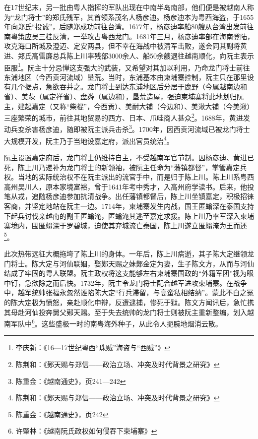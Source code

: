 在17世纪末，另一批由粤人指挥的军队出现在中南半岛南部，他们便是被越南人称为“龙门将士”的郑氏残军，其首领系茂名人杨彦迪。杨彦迪本为粤西海盗，于1655年向郑氏“投诚”，后随郑成功前往台湾。1677年，杨彦迪率船80艘从台湾出发前往南粤策应吴三桂反清，一举攻占粤西龙门。1681年三月，杨彦迪率部在海南登陆，攻克海口所城及澄迈、定安两县，但不幸在海战中被清军击败，遂会同其副将黄进、郑氏高雷廉总兵陈上川率残部3000余人、船50余艘退往越南顺化，向阮主表示臣服\footnote{李庆新：《16—17世纪粤西“珠贼”海盗与“西贼”》}。阮主十分忌惮这支强大的武装，又希望对其加以利用，乃命龙门将士前往东浦地区（今西贡河流域）垦荒。当时，东浦基本由柬埔寨控制，阮主只在那里设有几个据点，急欲吞并之。龙门将士到达东浦地区后分居于鹿野（今属越南边和省）、美萩（属定祥省）、盘粦（属边和），垦荒造屋，强迫柬埔寨将此地划归阮主，建起嘉定（又称“柴棍”，今西贡）、美耐大铺（今边和）、美湫大铺（今美湫）三座繁荣的城市，前往其地贸易的西方、日本、爪哇商人甚众\footnote{陈荆和：《鄚天赐与郑信——政治立场、冲突及时代背景之研究》}。1688年，黄进发动兵变杀害杨彦迪，随即被阮主派兵击杀\footnote{陈重金：《越南通史》，页241—242}。1700年，因西贡河流域已被龙门将士大规模开发，阮主乃于当地设嘉定府，派出官员统治\footnote{陈荆和：《鄚天赐与郑信——政治立场、冲突及时代背景之研究》}。

阮主设置嘉定府后，龙门将士仍维持自主，不受越南军官节制。因杨彦迪、黄进已死，陈上川乃递补为龙门将士的新领袖，被阮主任命为“藩镇都督”，掌管嘉定兵权。当地的实际统治权不在阮主派出的流官手中，而是归于陈上川。陈上川系粤西高州吴川人，原本家境富裕，曾于1641年考中秀才，入高州府学读书。后来，他投笔从戎，追随杨彦迪参加抗清战争。出任藩镇都督后，陈上川坐镇嘉定，积极招徕客商，并坚定地站在阮主一边。1714年，柬埔寨发生内战，国王匿螉深在泰国支持下起兵讨伐亲越南的副王匿螉淹，匿螉淹其逃至嘉定求援。陈上川乃率军深入柬埔寨境内，围匿螉深于罗碧城，迫使其弃城流亡泰国，陈上川遂立匿螉淹为王而还\footnote{陈重金：《越南通史》，页242}。

此次热带远征大概拖垮了陈上川的身体。一年后，陈上川病逝，其子陈大定继领龙门将士。陈大定与河仙联姻，娶鄚天赐之妹鄚金定为妻，生子陈文方，从而与河仙结成了牢固的粤人联盟。阮主政权将这支能够左右柬埔寨国政的“外籍军团”视为眼中钉，急欲除之而后快。1732年，阮主令龙门将士配合越军进攻柬埔寨。在战争中，越军统帅张福永忽然诬陷陈大定“行兵滞留，与高蛮私相结纳”。蒙此不白之冤的陈大定极为愤怒，亲赴顺化申辩，反遭逮捕，惨死于狱。陈文方闻讯后，急忙携其母赴河仙投奔舅父鄚天赐。至于失去统帅的龙门将士则被阮主重新整编，划入越南军队中\footnote{许肇林：《越南阮氏政权如何侵吞下柬埔寨》}。这些盛极一时的南粤海外种子，从此令人扼腕地烟消云散。

